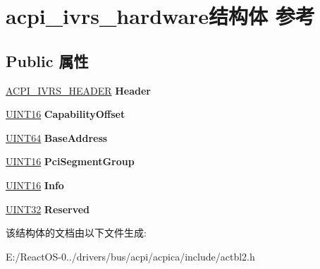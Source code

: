 \hypertarget{structacpi__ivrs__hardware}{}\section{acpi\+\_\+ivrs\+\_\+hardware结构体 参考}
\label{structacpi__ivrs__hardware}
\subsection*{Public 属性}
\begin{DoxyCompactItemize}
\item 
\mbox{\label{structacpi__ivrs__hardware_a2e12ef9c37e7bcb341fce8082bef6ba3}} 
\hyperlink{structacpi__ivrs__header}{A\+C\+P\+I\+\_\+\+I\+V\+R\+S\+\_\+\+H\+E\+A\+D\+ER} {\bfseries Header}
\item 
\mbox{\label{structacpi__ivrs__hardware_a64ac60c4d7fef014ec8152a2c51c91f6}} 
\hyperlink{_processor_bind_8h_a09f1a1fb2293e33483cc8d44aefb1eb1}{U\+I\+N\+T16} {\bfseries Capability\+Offset}
\item 
\mbox{\label{structacpi__ivrs__hardware_a5e911e7a20f642d3d6613c3de74b06f7}} 
\hyperlink{_processor_bind_8h_a57be03562867144161c1bfee95ca8f7c}{U\+I\+N\+T64} {\bfseries Base\+Address}
\item 
\mbox{\label{structacpi__ivrs__hardware_a5a6e1a43767da5f591bea50e67bd6bec}} 
\hyperlink{_processor_bind_8h_a09f1a1fb2293e33483cc8d44aefb1eb1}{U\+I\+N\+T16} {\bfseries Pci\+Segment\+Group}
\item 
\mbox{\label{structacpi__ivrs__hardware_aee29efdfb056d471d56490783fabd3d6}} 
\hyperlink{_processor_bind_8h_a09f1a1fb2293e33483cc8d44aefb1eb1}{U\+I\+N\+T16} {\bfseries Info}
\item 
\mbox{\label{structacpi__ivrs__hardware_a6103b4afc8fcf06b1d6bb70e62e92539}} 
\hyperlink{_processor_bind_8h_ae1e6edbbc26d6fbc71a90190d0266018}{U\+I\+N\+T32} {\bfseries Reserved}
\end{DoxyCompactItemize}


该结构体的文档由以下文件生成\+:\begin{DoxyCompactItemize}
\item 
E\+:/\+React\+O\+S-\/0../drivers/bus/acpi/acpica/include/actbl2.\+h\end{DoxyCompactItemize}
